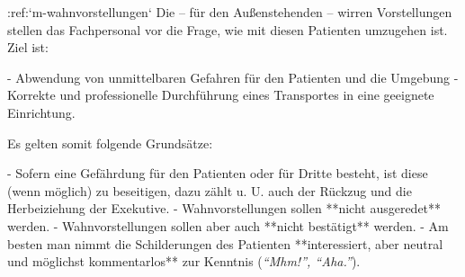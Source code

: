 :ref:`m-wahnvorstellungen`
Die -- für
den Außenstehenden -- wirren Vorstellungen stellen das Fachpersonal vor die Frage, wie mit diesen
Patienten umzugehen ist.
Ziel ist:
\begin{enumerate}
  -   Abwendung von unmittelbaren Gefahren für den
  Patienten und die Umgebung
  -   Korrekte und professionelle Durchführung eines
  Transportes in eine geeignete Einrichtung.
\end{enumerate}
Es gelten somit folgende Grundsätze:
\begin{enumerate}
  -   Sofern eine Gefährdung für den Patienten oder für
  Dritte besteht, ist diese (wenn möglich) zu beseitigen,
  dazu zählt u. U. auch der Rückzug und die Herbeiziehung
  der Exekutive.
  -   Wahnvorstellungen sollen **nicht ausgeredet**
  werden.
  -    Wahnvorstellungen sollen aber auch **nicht
  bestätigt** werden.
  -   Am besten man nimmt die Schilderungen des
  Patienten **interessiert, aber neutral und möglichst
  kommentarlos** zur Kenntnis (\emph{\enquote{Mhm!}, \enquote{Aha.}}).
\end{enumerate}